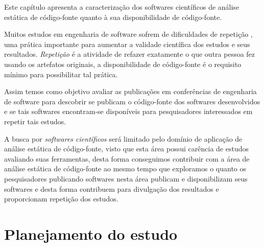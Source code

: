 {Este capítulo apresenta a caracterização dos softwares científicos de análise
estática de código-fonte quanto à sua disponibilidade de código-fonte.}
\label{caracterizacao-ferramentas}


Muitos estudos em engenharia de software sofrem de dificuldades de repetição
\cite{Tang2016}, uma prática importante para aumentar a validade científica dos
estudos e seus resultados. {\it Repetição} é a atividade de refazer exatamente
o que outra pessoa fez usando os artefatos originais, a disponibilidade de
código-fonte é o requisito mínimo para possibilitar tal prática.

Assim temos como objetivo avaliar as publicações em conferências de engenharia
de software para descobrir se publicam o código-fonte dos softwares desenvolvidos
e se tais softwares encontram-se disponíveis para pesquisadores interessados em
repetir tais estudos.

A busca por {\it softwares científicos} será limitado pelo domínio de aplicação
de análise estática de código-fonte, visto que esta área possui carência de estudos
avaliando suas ferramentas, desta forma conseguimos contribuir com a área de
análise estática de código-fonte ao mesmo tempo que exploramos o quanto os
pesquisadores publicando softwares nesta área publicam e disponibilizam seus
softwares e desta forma contribuem para divulgação dos resultados e proporcionam
repetição dos estudos.

\section{Planejamento do estudo}

